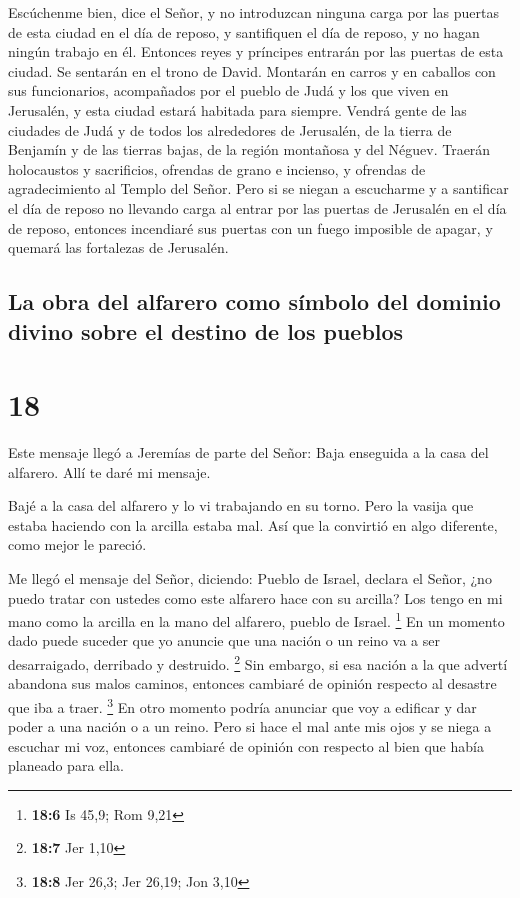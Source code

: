 Escúchenme bien, dice el Señor, y no introduzcan ninguna
carga por las puertas de esta ciudad en el día de reposo, y santifiquen
el día de reposo, y no hagan ningún trabajo en él. 
Entonces reyes y príncipes entrarán por las puertas de esta ciudad. Se
sentarán en el trono de David. Montarán en carros y en caballos con sus
funcionarios, acompañados por el pueblo de Judá y los que viven en
Jerusalén, y esta ciudad estará habitada para siempre. 
Vendrá gente de las ciudades de Judá y de todos los alrededores de
Jerusalén, de la tierra de Benjamín y de las tierras bajas, de la región
montañosa y del Néguev. Traerán holocaustos y sacrificios, ofrendas de
grano e incienso, y ofrendas de agradecimiento al Templo del Señor.
 Pero si se niegan a escucharme y a santificar el día de
reposo no llevando carga al entrar por las puertas de Jerusalén en el
día de reposo, entonces incendiaré sus puertas con un fuego imposible de
apagar, y quemará las fortalezas de Jerusalén.

\hypertarget{la-obra-del-alfarero-como-suxedmbolo-del-dominio-divino-sobre-el-destino-de-los-pueblos}{%
\subsection{La obra del alfarero como símbolo del dominio divino sobre
el destino de los
pueblos}\label{la-obra-del-alfarero-como-suxedmbolo-del-dominio-divino-sobre-el-destino-de-los-pueblos}}

\hypertarget{section-17}{%
\section{18}\label{section-17}}

 Este mensaje llegó a Jeremías de parte del Señor:
 Baja enseguida a la casa del alfarero. Allí te daré mi
mensaje.

 Bajé a la casa del alfarero y lo vi trabajando en su
torno.  Pero la vasija que estaba haciendo con la arcilla
estaba mal. Así que la convirtió en algo diferente, como mejor le
pareció.

 Me llegó el mensaje del Señor, diciendo: 
Pueblo de Israel, declara el Señor, ¿no puedo tratar con ustedes como
este alfarero hace con su arcilla? Los tengo en mi mano como la arcilla
en la mano del alfarero, pueblo de Israel. \footnote{\textbf{18:6} Is
  45,9; Rom 9,21}  En un momento dado puede suceder que yo
anuncie que una nación o un reino va a ser desarraigado, derribado y
destruido. \footnote{\textbf{18:7} Jer 1,10}  Sin embargo,
si esa nación a la que advertí abandona sus malos caminos, entonces
cambiaré de opinión respecto al desastre que iba a traer. \footnote{\textbf{18:8}
  Jer 26,3; Jer 26,19; Jon 3,10}  En otro momento podría
anunciar que voy a edificar y dar poder a una nación o a un reino.
 Pero si hace el mal ante mis ojos y se niega a escuchar
mi voz, entonces cambiaré de opinión con respecto al bien que había
planeado para ella.

